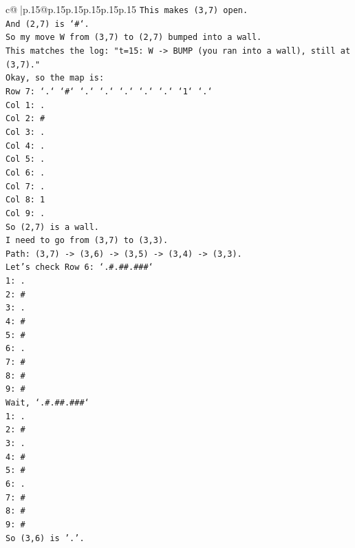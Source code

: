 \documentclass{article}
\begin{document}
{\begin{supertabular}{c@{$\;$}|p{.15\linewidth}@{}p{.15\linewidth}p{.15\linewidth}p{.15\linewidth}p{.15\linewidth}p{.15\linewidth}}
{{{\texttt{This makes (3,7) open.} \\
\texttt{And (2,7) is `\#`.} \\
\texttt{So my move W from (3,7) to (2,7) bumped into a wall.} \\
\texttt{This matches the log: "t=15: W {-}> BUMP (you ran into a wall), still at (3,7)."} \\
\texttt{Okay, so the map is:} \\
\texttt{Row 7: `.` `\#` `.` `.` `.` `.` `.` `1` `.`} \\
\texttt{Col 1: .} \\
\texttt{Col 2: \#} \\
\texttt{Col 3: .} \\
\texttt{Col 4: .} \\
\texttt{Col 5: .} \\
\texttt{Col 6: .} \\
\texttt{Col 7: .} \\
\texttt{Col 8: 1} \\
\texttt{Col 9: .} \\
\texttt{So (2,7) is a wall.} \\
\texttt{I need to go from (3,7) to (3,3).} \\
\texttt{Path: (3,7) {-}> (3,6) {-}> (3,5) {-}> (3,4) {-}> (3,3).} \\
\texttt{Let's check Row 6: `.\#.\#\#.\#\#\#`} \\
\texttt{1: .} \\
\texttt{2: \#} \\
\texttt{3: .} \\
\texttt{4: \#} \\
\texttt{5: \#} \\
\texttt{6: .} \\
\texttt{7: \#} \\
\texttt{8: \#} \\
\texttt{9: \#} \\
\texttt{Wait, `.\#.\#\#.\#\#\#`} \\
\texttt{1: .} \\
\texttt{2: \#} \\
\texttt{3: .} \\
\texttt{4: \#} \\
\texttt{5: \#} \\
\texttt{6: .} \\
\texttt{7: \#} \\
\texttt{8: \#} \\
\texttt{9: \#} \\
\texttt{So (3,6) is '.'.} \\
}}}
\end{supertabular}}
\end{document}
